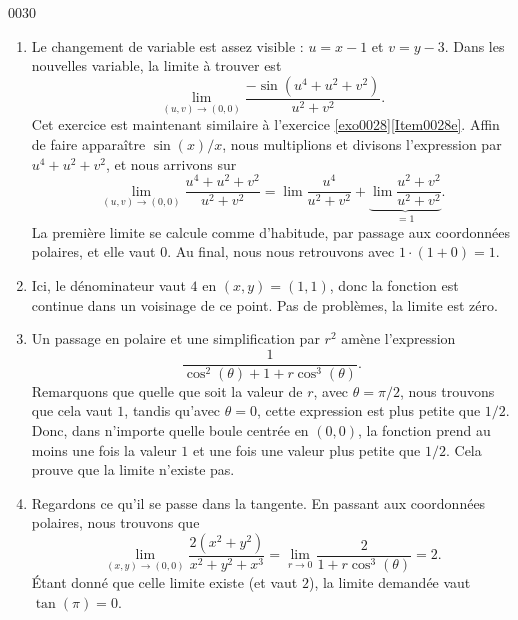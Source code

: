 
\begin{corrige}{0030}

\begin{enumerate}
\item
Le changement de variable est assez visible : $u=x-1$ et $v=y-3$. Dans les nouvelles variable, la limite à trouver est
\begin{equation}
	\lim_{(u,v)\to(0,0)}\frac{ -\sin(u^4+u^2+v^2) }{ u^2+v^2 }.
\end{equation}
Cet exercice est maintenant similaire à l'exercice \ref{exo0028}\ref{Item0028e}. Affin de faire apparaître $\sin(x)/x$, nous multiplions et divisons l'expression par $u^4+u^2+v^2$, et nous arrivons sur
\begin{equation}
	\lim_{(u,v)\to(0,0)}\frac{ u^4+u^2+v^2 }{ u^2+v^2 }=\lim\frac{ u^4 }{ u^2+v^2 }+\underbrace{\lim\frac{ u^2+v^2 }{ u^2+v^2 }}_{=1}.
\end{equation}
La première limite se calcule comme d'habitude, par passage aux coordonnées polaires, et elle vaut $0$. Au final, nous nous retrouvons avec $1\cdot(1+0)=1$.

\item
Ici, le dénominateur vaut $4$ en $(x,y)=(1,1)$, donc la fonction est continue dans un voisinage de ce point. Pas de problèmes, la limite est zéro.

\item
Un passage en polaire et une simplification par $r^2$ amène l'expression
\begin{equation}
	\frac{1}{ \cos^2(\theta)+1+r\cos^3(\theta) }.
\end{equation}
Remarquons que quelle que soit la valeur de $r$, avec $\theta=\pi/2$, nous trouvons que cela vaut $1$, tandis qu'avec $\theta=0$, cette expression est plus petite que $1/2$. Donc, dans n'importe quelle boule centrée en $(0,0)$, la fonction prend au moins une fois la valeur $1$ et une fois une valeur plus petite que $1/2$. Cela prouve que la limite n'existe pas.

\item
Regardons ce qu'il se passe dans la tangente. En passant aux coordonnées polaires, nous trouvons que
\begin{equation}
	\lim_{(x,y)\to(0,0)}\frac{ 2(x^2+y^2) }{ x^2+y^2+x^3 }=\lim_{r\to 0}\frac{ 2 }{ 1+r\cos^3(\theta) }=2.
\end{equation}
Étant donné que celle limite existe (et vaut $2$), la limite demandée vaut $\tan(\pi)=0$.

\end{enumerate}

\end{corrige}
